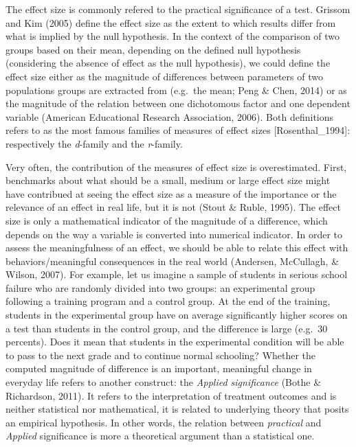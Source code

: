 \documentclass[man]{apa6}
\begin{document}
The effect size is commonly refered to the practical significance of a test. Grissom and Kim (2005) define the effect size as the extent to which results differ from what is implied by the null hypothesis. In the context of the comparison of two groups based on their mean, depending on the defined null hypothesis (considering the absence of effect as the null hypothesis), we could define the effect size either as the magnitude of differences between parameters of two populations groups are extracted from (e.g.~the mean; Peng \& Chen, 2014) or as the magnitude of the relation between one dichotomous factor and one dependent variable (American Educational Research Association, 2006). Both definitions refers to as the most famous families of measures of effect sizes {[}Rosenthal\_1994{]}: respectively the \emph{d}-family and the \emph{r}-family.

Very often, the contribution of the measures of effect size is overestimated. First, benchmarks about what should be a small, medium or large effect size might have contribued at seeing the effect size as a measure of the importance or the relevance of an effect in real life, but it is not (Stout \& Ruble, 1995). The effect size is only a mathematical indicator of the magnitude of a difference, which depends on the way a variable is converted into numerical indicator. In order to assess the meaningfulness of an effect, we should be able to relate this effect with behaviors/meaningful consequences in the real world (Andersen, McCullagh, \& Wilson, 2007). For example, let us imagine a sample of students in serious school failure who are randomly divided into two groups: an experimental group following a training program and a control group. At the end of the training, students in the experimental group have on average significantly higher scores on a test than students in the control group, and the difference is large (e.g.~30 percents). Does it mean that students in the experimental condition will be able to pass to the next grade and to continue normal schooling? Whether the computed magnitude of difference is an important, meaningful change in everyday life refers to another construct: the \emph{Applied significance} (Bothe \& Richardson, 2011). It refers to the interpretation of treatment outcomes and is neither statistical nor mathematical, it is related to underlying theory that posits an empirical hypothesis. In other words, the relation between \emph{practical} and \emph{Applied} significance is more a theoretical argument than a statistical one.
\end{document}
